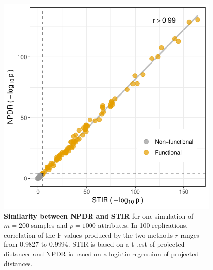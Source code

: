 \documentclass{article}
\begin{document}
\begin{figure}[h]%
\centerline{\includegraphics[]{../figs/npdr_stir_p_cc.pdf}}
\caption{\textbf{Similarity between NPDR and STIR} for one simulation of $m = 200$ samples and $p = 1000$ attributes. In 100 replications, correlation of the P values produced by the two methods $r$ ranges from 0.9827 to 0.9994. STIR is based on a t-test of projected distances and NPDR is based on a logistic regression of projected distances.}
\label{fig:npdr_stir}
\end{figure}

\end{document}
